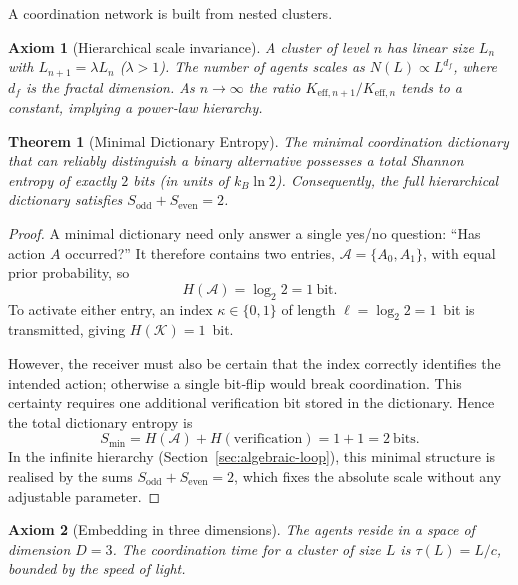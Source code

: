 \documentclass[12pt,a4paper]{article}
\newtheorem{axiom}{Axiom}
\newtheorem{theorem}{Theorem}[section]
\begin{document}
	A coordination network is built from nested clusters.
	
	\begin{axiom}[Hierarchical scale invariance] \label{ax:A1}
		A cluster of level \(n\) has linear size \(L_n\) with \(L_{n+1} = \lambda L_n\) (\(\lambda > 1\)).  The number of agents scales as \(N(L) \propto L^{d_f}\), where \(d_f\) is the fractal dimension.  As \(n \to \infty\) the ratio \(K_{\mathrm{eff},n+1}/K_{\mathrm{eff},n}\) tends to a constant, implying a power‑law hierarchy.
	\end{axiom}
	
	\begin{theorem}[Minimal Dictionary Entropy]
		\label{thm:minimal-dict}
		The minimal coordination dictionary that can reliably distinguish a binary alternative possesses a total Shannon entropy of exactly \(2\) bits (in units of \(k_B\ln 2\)).  Consequently, the full hierarchical dictionary satisfies \(S_{\mathrm{odd}} + S_{\mathrm{even}} = 2\).
	\end{theorem}
	
	\begin{proof}
		A minimal dictionary need only answer a single yes/no question: ``Has action \(A\) occurred?''  It therefore contains two entries, \(\mathcal{A} = \{A_0, A_1\}\), with equal prior probability, so
		\[
		H(\mathcal{A}) = \log_2 2 = 1\ \text{bit}.
		\]
		To activate either entry, an index \(\kappa \in \{0,1\}\) of length \(\ell = \log_2 2 = 1\)~bit is transmitted, giving \(H(\mathcal{K}) = 1\)~bit.
		
		However, the receiver must also be certain that the index correctly identifies the intended action; otherwise a single bit‑flip would break coordination.  This certainty requires one additional verification bit stored in the dictionary.  Hence the total dictionary entropy is
		\[
		S_{\min} = H(\mathcal{A}) + H(\text{verification}) = 1 + 1 = 2\ \text{bits}.
		\]
		In the infinite hierarchy (Section~\ref{sec:algebraic-loop}), this minimal structure is realised by the sums \(S_{\mathrm{odd}} + S_{\mathrm{even}} = 2\), which fixes the absolute scale without any adjustable parameter.
	\end{proof}

	\begin{axiom}[Embedding in three dimensions] \label{ax:A3}
		The agents reside in a space of dimension \(D = 3\).  The coordination time for a cluster of size \(L\) is \(\tau(L) = L/c\), bounded by the speed of light.
	\end{axiom}
	
\end{document}
